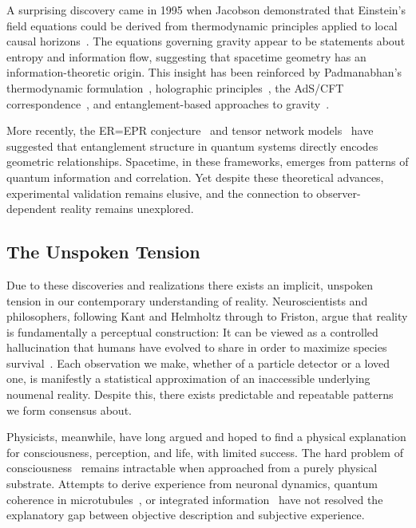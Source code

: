 \documentclass[11pt]{article}
\begin{document}
A surprising discovery came in 1995 when Jacobson demonstrated that Einstein's field equations could be derived from thermodynamic principles applied to local causal horizons~\cite{Jacobson1995}. The equations governing gravity appear to be statements about entropy and information flow, suggesting that spacetime geometry has an information-theoretic origin. This insight has been reinforced by Padmanabhan's thermodynamic formulation~\cite{Padmanabhan2010}, holographic principles~\cite{Bousso2002}, the AdS/CFT correspondence~\cite{Maldacena1999}, and entanglement-based approaches to gravity~\cite{VanRaamsdonk2010}.

More recently, the ER=EPR conjecture~\cite{MaldacenaSusskind2013} and tensor network models~\cite{Swingle2012} have suggested that entanglement structure in quantum systems directly encodes geometric relationships. Spacetime, in these frameworks, emerges from patterns of quantum information and correlation. Yet despite these theoretical advances, experimental validation remains elusive, and the connection to observer-dependent reality remains unexplored.

\subsection{The Unspoken Tension}

Due to these discoveries and realizations there exists an implicit, unspoken tension in our contemporary understanding of reality. Neuroscientists and philosophers, following Kant and Helmholtz through to Friston, argue that reality is fundamentally a perceptual construction:  It can be viewed as a controlled hallucination that humans have evolved to share in order to maximize species survival~\cite{Clark2016,Hoffman2019}. Each observation we make, whether of a particle detector or a loved one, is manifestly a statistical approximation of an inaccessible underlying noumenal reality. Despite this, there exists predictable and repeatable patterns we form consensus about.

Physicists, meanwhile, have long argued and hoped to find a physical explanation for consciousness, perception, and life, with limited success. The hard problem of consciousness~\cite{Chalmers1995} remains intractable when approached from a purely physical substrate. Attempts to derive experience from neuronal dynamics, quantum coherence in microtubules~\cite{HameroffPenrose1996}, or integrated information~\cite{Tononi2008} have not resolved the explanatory gap between objective description and subjective experience.
\end{document}
